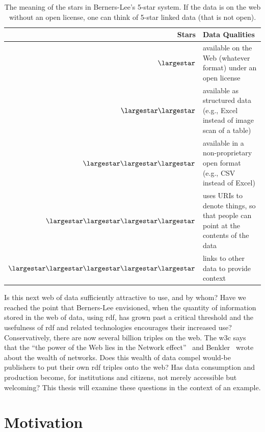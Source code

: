 \begin{doublespace}
\begin{table}[htp]
\caption{The meaning of the stars in Berners-Lee's 5-star system. If the data is on the web without an open license, one can think of 5-star linked data (that is not open).}
\begin{center}
\begin{tabular}{|r|p{10cm}|}
\hline
Stars & Data Qualities \\ \hline
$\largestar$ & available on the Web (whatever format) under an open license \\ \hline
$\largestar\largestar$ & available as structured data (e.g., Excel instead of image scan of a table) \\ \hline 
$\largestar\largestar\largestar$ & available in a non-proprietary open format (e.g., CSV instead of Excel)\\ \hline
$\largestar\largestar\largestar\largestar$ & uses URIs to denote things, so that people can point at the contents of the data\\ \hline
$\largestar\largestar\largestar\largestar\largestar$ & links to other data to provide context\\ \hline
\end{tabular}
\end{center}
\label{tab:fivestars}
\end{table}%

Is this next web of data sufficiently attractive to use, and by whom?
Have we reached the point that Berners-Lee envisioned, 
when the quantity of information stored in the web of data, 
using \ac{rdf},
has grown past a critical threshold and the usefulness of \ac{rdf} and related technologies 
encourages their increased use?
Conservatively, there are now several billion triples on the web.
The \ac{w3c} says that the ``the power of the Web lies in the Network effect''~\cite{DWBP2017tr}
and Benkler~\cite{benkler} wrote about the wealth of networks.
Does this wealth of data compel would-be publishers to put their own
\ac{rdf} triples onto the web? Has data consumption and production become,
for institutions and citizens, not merely accessible but welcoming?
This thesis will examine these questions in the context of an example.


\section{Motivation}
\label{sec:motivation}


\end{doublespace}
